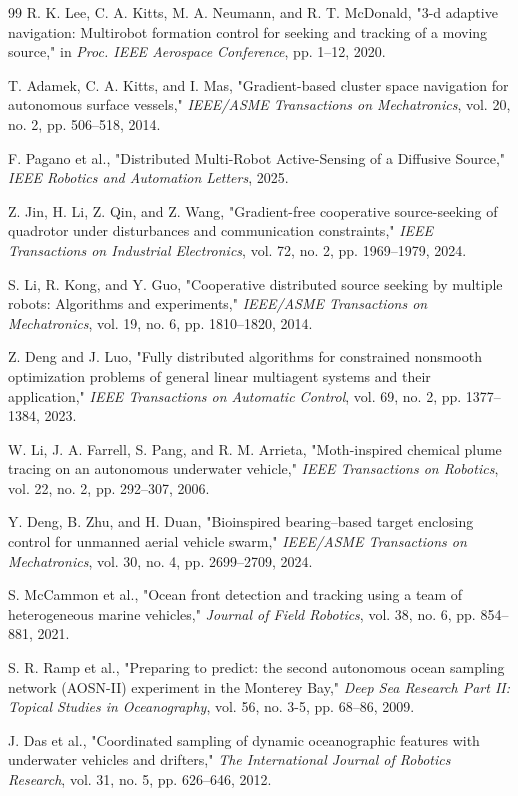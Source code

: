 \documentclass[lettersize,journal]{IEEEtran}
\begin{document}
\begin{thebibliography}{99}
 R. K. Lee, C. A. Kitts, M. A. Neumann, and R. T. McDonald, "3-d adaptive navigation: Multirobot formation control for seeking and tracking of a moving source," in \textit{Proc. IEEE Aerospace Conference}, pp. 1--12, 2020.

 T. Adamek, C. A. Kitts, and I. Mas, "Gradient-based cluster space navigation for autonomous surface vessels," \textit{IEEE/ASME Transactions on Mechatronics}, vol. 20, no. 2, pp. 506--518, 2014.

 F. Pagano et al., "Distributed Multi-Robot Active-Sensing of a Diffusive Source," \textit{IEEE Robotics and Automation Letters}, 2025.

 Z. Jin, H. Li, Z. Qin, and Z. Wang, "Gradient-free cooperative source-seeking of quadrotor under disturbances and communication constraints," \textit{IEEE Transactions on Industrial Electronics}, vol. 72, no. 2, pp. 1969--1979, 2024.

 S. Li, R. Kong, and Y. Guo, "Cooperative distributed source seeking by multiple robots: Algorithms and experiments," \textit{IEEE/ASME Transactions on Mechatronics}, vol. 19, no. 6, pp. 1810--1820, 2014.

 Z. Deng and J. Luo, "Fully distributed algorithms for constrained nonsmooth optimization problems of general linear multiagent systems and their application," \textit{IEEE Transactions on Automatic Control}, vol. 69, no. 2, pp. 1377--1384, 2023.

 W. Li, J. A. Farrell, S. Pang, and R. M. Arrieta, "Moth-inspired chemical plume tracing on an autonomous underwater vehicle," \textit{IEEE Transactions on Robotics}, vol. 22, no. 2, pp. 292--307, 2006.

 Y. Deng, B. Zhu, and H. Duan, "Bioinspired bearing–based target enclosing control for unmanned aerial vehicle swarm," \textit{IEEE/ASME Transactions on Mechatronics}, vol. 30, no. 4, pp. 2699--2709, 2024.

 S. McCammon et al., "Ocean front detection and tracking using a team of heterogeneous marine vehicles," \textit{Journal of Field Robotics}, vol. 38, no. 6, pp. 854--881, 2021.

 S. R. Ramp et al., "Preparing to predict: the second autonomous ocean sampling network (AOSN-II) experiment in the Monterey Bay," \textit{Deep Sea Research Part II: Topical Studies in Oceanography}, vol. 56, no. 3-5, pp. 68--86, 2009.

 J. Das et al., "Coordinated sampling of dynamic oceanographic features with underwater vehicles and drifters," \textit{The International Journal of Robotics Research}, vol. 31, no. 5, pp. 626--646, 2012.


\end{thebibliography}
\end{document}
